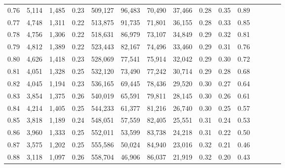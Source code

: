 \begin{tabular}{rrrcrrrrrrrrrrr}
0.76 &   5,114 &   1,485 &                                       0.23 &  509,127 &   96,483 &   70,490 &   37,466 &  0.28 &  0.35 &                         0.89 \\
0.77 &   4,748 &   1,311 &                                       0.22 &  513,875 &   91,735 &   71,801 &   36,155 &  0.28 &  0.33 &                         0.85 \\
0.78 &   4,756 &   1,306 &                                       0.22 &  518,631 &   86,979 &   73,107 &   34,849 &  0.29 &  0.32 &                         0.81 \\
0.79 &   4,812 &   1,389 &                                       0.22 &  523,443 &   82,167 &   74,496 &   33,460 &  0.29 &  0.31 &                         0.76 \\
0.80 &   4,626 &   1,418 &                                       0.23 &  528,069 &   77,541 &   75,914 &   32,042 &  0.29 &  0.30 &                         0.72 \\
0.81 &   4,051 &   1,328 &                                       0.25 &  532,120 &   73,490 &   77,242 &   30,714 &  0.29 &  0.28 &                         0.68 \\
0.82 &   4,045 &   1,194 &                                       0.23 &  536,165 &   69,445 &   78,436 &   29,520 &  0.30 &  0.27 &                         0.64 \\
0.83 &   3,854 &   1,375 &                                       0.26 &  540,019 &   65,591 &   79,811 &   28,145 &  0.30 &  0.26 &                         0.61 \\
0.84 &   4,214 &   1,405 &                                       0.25 &  544,233 &   61,377 &   81,216 &   26,740 &  0.30 &  0.25 &                         0.57 \\
0.85 &   3,818 &   1,189 &                                       0.24 &  548,051 &   57,559 &   82,405 &   25,551 &  0.31 &  0.24 &                         0.53 \\
0.86 &   3,960 &   1,333 &                                       0.25 &  552,011 &   53,599 &   83,738 &   24,218 &  0.31 &  0.22 &                         0.50 \\
0.87 &   3,575 &   1,202 &                                       0.25 &  555,586 &   50,024 &   84,940 &   23,016 &  0.32 &  0.21 &                         0.46 \\
0.88 &   3,118 &   1,097 &                                       0.26 &  558,704 &   46,906 &   86,037 &   21,919 &  0.32 &  0.20 &                         0.43 \\

\end{tabular}
